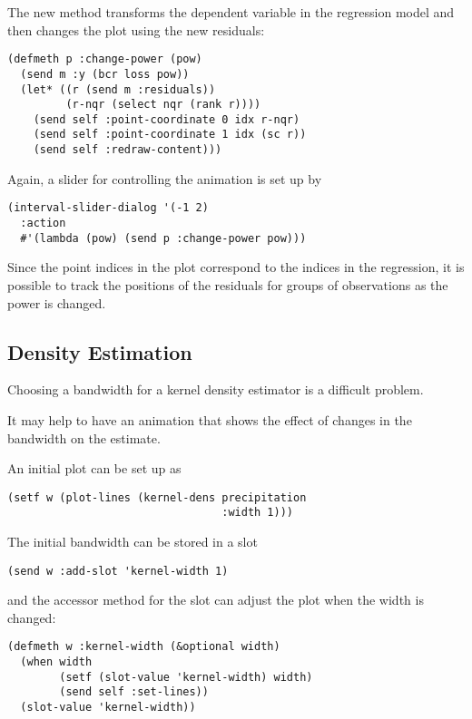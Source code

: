 \begin{slide}{}
The new  method transforms the dependent variable
in the regression model and then changes the plot using the new residuals:
{\Large
\begin{verbatim}
(defmeth p :change-power (pow)
  (send m :y (bcr loss pow))
  (let* ((r (send m :residuals))
         (r-nqr (select nqr (rank r))))
    (send self :point-coordinate 0 idx r-nqr)
    (send self :point-coordinate 1 idx (sc r))
    (send self :redraw-content)))
\end{verbatim}}
Again, a slider for controlling the animation is set up by
{\Large
\begin{verbatim}
(interval-slider-dialog '(-1 2)
  :action
  #'(lambda (pow) (send p :change-power pow)))
\end{verbatim}}
Since the point indices in the plot correspond to the indices in the
regression, it is possible to track the positions of the residuals
for groups of observations as the power is changed.

\end{slide}

\begin{slide}{}
\subsection{Density Estimation}
Choosing a bandwidth for a kernel density estimator is a difficult
problem.

It may help to have an animation that shows the effect of changes in
the bandwidth on the estimate.

An initial plot can be set up as
{\Large
\begin{verbatim}
(setf w (plot-lines (kernel-dens precipitation
                                 :width 1)))
\end{verbatim}}
The initial bandwidth can be stored in a slot
{\Large
\begin{verbatim}
(send w :add-slot 'kernel-width 1)
\end{verbatim}}
and the accessor method for the slot can adjust the plot when the
width is changed:
{\Large
\begin{verbatim}
(defmeth w :kernel-width (&optional width)
  (when width
        (setf (slot-value 'kernel-width) width)
        (send self :set-lines))
  (slot-value 'kernel-width))
\end{verbatim}}
\end{slide}

